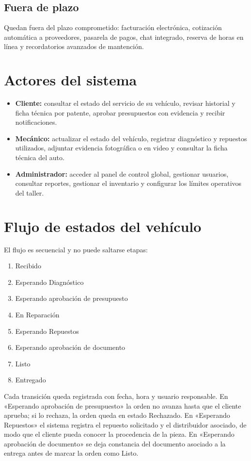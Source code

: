 \documentclass[11pt]{article}
\begin{document}
\subsection{Fuera de plazo}

Quedan fuera del plazo comprometido: facturación electrónica, cotización automática a proveedores, pasarela de pagos, chat integrado, reserva de horas en línea y recordatorios avanzados de mantención.

\section{Actores del sistema}

\begin{itemize}
  \item \textbf{Cliente:} consultar el estado del servicio de su vehículo, revisar historial y ficha técnica por patente, aprobar presupuestos con evidencia y recibir notificaciones.
  \item \textbf{Mecánico:} actualizar el estado del vehículo, registrar diagnóstico y repuestos utilizados, adjuntar evidencia fotográfica o en video y consultar la ficha técnica del auto.
  \item \textbf{Administrador:} acceder al panel de control global, gestionar usuarios, consultar reportes, gestionar el inventario y configurar los límites operativos del taller.
\end{itemize}

\section{Flujo de estados del vehículo}

El flujo es secuencial y no puede saltarse etapas:

\begin{enumerate}
  \item Recibido
  \item Esperando Diagnóstico
  \item Esperando aprobación de presupuesto
  \item En Reparación
  \item Esperando Repuestos
  \item Esperando aprobación de documento
  \item Listo
  \item Entregado
\end{enumerate}

Cada transición queda registrada con fecha, hora y usuario responsable. En «Esperando aprobación de presupuesto» la orden no avanza hasta que el cliente aprueba; si lo rechaza, la orden queda en estado Rechazado. En «Esperando Repuestos» el sistema registra el repuesto solicitado y el distribuidor asociado, de modo que el cliente pueda conocer la procedencia de la pieza. En «Esperando aprobación de documento» se deja constancia del documento asociado a la entrega antes de marcar la orden como Listo.
\end{document}
